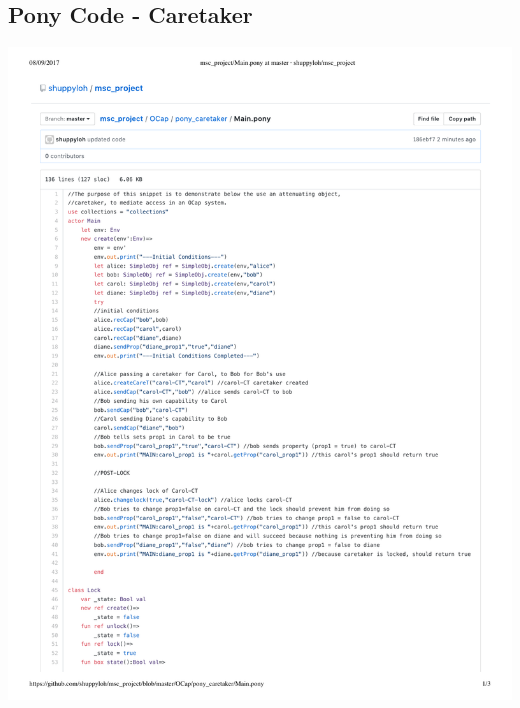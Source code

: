 \documentclass[a4paper,11pt,twoside]{article}
\begin{document}
{\subsection{Pony Code - Caretaker}\label{sec:code_Caretaker}
\begin{minipage}{\textwidth}
\includegraphics[width=\textwidth,valign=t,page=1]{figures/code_Caretaker.pdf}
\end{minipage}\clearpage
\begin{minipage}{\textwidth}

\end{minipage}}
\end{document}
